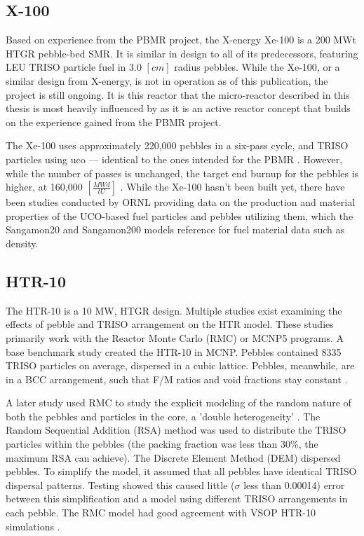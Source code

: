 \subsection{X-100}
\label{sec:xe-100}

Based on experience from the PBMR project, the X-energy Xe-100 is a 200 MWt HTGR pebble-bed SMR.  It is similar in design to all of its predecessors, featuring LEU TRISO particle fuel in 3.0 $\left[cm\right]$ radius pebbles.  While the Xe-100, or a similar design from X-energy, is not in operation as of this publication, the project is still ongoing.  It is this reactor that the micro-reactor described in this thesis is most heavily influenced by as it is an active reactor concept that builds on the experience gained from the PBMR project.

The Xe-100 uses approximately 220,000 pebbles in a six-pass cycle, and TRISO particles using \acrfull{uco} --- identical to the ones intended for the PBMR \cite{harlan_x-energy_2018}.  However, while the number of passes is unchanged, the target end burnup for the pebbles is higher, at 160,000 $\left[\frac{MWd}{tU}\right]$ \cite{agnihotri_intrinsically_2017}.  While the Xe-100 hasn't been built yet, there have been studies conducted by ORNL providing data on the production and material properties of the UCO-based fuel particles \cite{helmreich_year_2017} and pebbles utilizing them, which the Sangamon20 and Sangamon200 models reference for fuel material data such as density.

\subsection{HTR-10}

The HTR-10 is a 10 MW, HTGR design.  Multiple studies exist examining the effects of pebble and TRISO arrangement on the HTR model.  These studies primarily work with the Reactor Monte Carlo (RMC) or MCNP5 programs.  A base benchmark study created the HTR-10 in MCNP.  Pebbles contained 8335 TRISO particles on average, dispersed in a cubic lattice.  Pebbles, meanwhile, are in a BCC arrangement, such that F/M ratios and void fractions stay constant \cite{kim_monte_2005}.

A later study used RMC to study the explicit modeling of the random nature of both the pebbles and particles in the core, a 'double heterogeneity' \cite{ she_explicit_nodate}.  The Random Sequential Addition (RSA) method was used to distribute the TRISO particles within the pebbles (the packing fraction was less than 30\%, the maximum RSA can achieve).  The Discrete Element Method (DEM) dispersed pebbles.  To simplify the model, it assumed that all pebbles have identical TRISO dispersal patterns.  Testing showed this caused little ($\sigma$ less than 0.00014) error between this simplification and a model using different TRISO arrangements in each pebble.  The RMC model had good agreement with VSOP HTR-10 simulations \cite{ she_explicit_nodate}.

